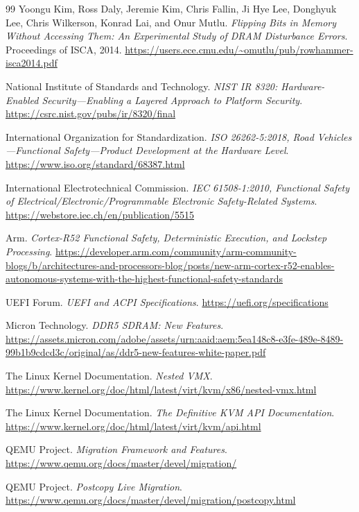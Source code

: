 \begin{thebibliography}{99}
Yoongu Kim, Ross Daly, Jeremie Kim, Chris Fallin, Ji Hye Lee,
Donghyuk Lee, Chris Wilkerson, Konrad Lai, and Onur Mutlu.
\emph{Flipping Bits in Memory Without Accessing Them: An Experimental Study of DRAM Disturbance Errors}.
Proceedings of ISCA, 2014.
\url{https://users.ece.cmu.edu/~omutlu/pub/rowhammer-isca2014.pdf}

National Institute of Standards and Technology.
\emph{NIST IR 8320: Hardware-Enabled Security---Enabling a Layered Approach to Platform Security}.
\url{https://csrc.nist.gov/pubs/ir/8320/final}

International Organization for Standardization.
\emph{ISO 26262-5:2018, Road Vehicles---Functional Safety---Product Development at the Hardware Level}.
\url{https://www.iso.org/standard/68387.html}

International Electrotechnical Commission.
\emph{IEC 61508-1:2010, Functional Safety of Electrical/Electronic/Programmable Electronic Safety-Related Systems}.
\url{https://webstore.iec.ch/en/publication/5515}

Arm.
\emph{Cortex-R52 Functional Safety, Deterministic Execution, and Lockstep Processing}.
\url{https://developer.arm.com/community/arm-community-blogs/b/architectures-and-processors-blog/posts/new-arm-cortex-r52-enables-autonomous-systems-with-the-highest-functional-safety-standards}

UEFI Forum.
\emph{UEFI and ACPI Specifications}.
\url{https://uefi.org/specifications}

Micron Technology.
\emph{DDR5 SDRAM: New Features}.
\url{https://assets.micron.com/adobe/assets/urn:aaid:aem:5ea148c8-e3fe-489e-8489-99b1b9cdcd3c/original/as/ddr5-new-features-white-paper.pdf}

The Linux Kernel Documentation.
\emph{Nested VMX}.
\url{https://www.kernel.org/doc/html/latest/virt/kvm/x86/nested-vmx.html}

The Linux Kernel Documentation.
\emph{The Definitive KVM API Documentation}.
\url{https://www.kernel.org/doc/html/latest/virt/kvm/api.html}

QEMU Project.
\emph{Migration Framework and Features}.
\url{https://www.qemu.org/docs/master/devel/migration/}

QEMU Project.
\emph{Postcopy Live Migration}.
\url{https://www.qemu.org/docs/master/devel/migration/postcopy.html}


\end{thebibliography}
